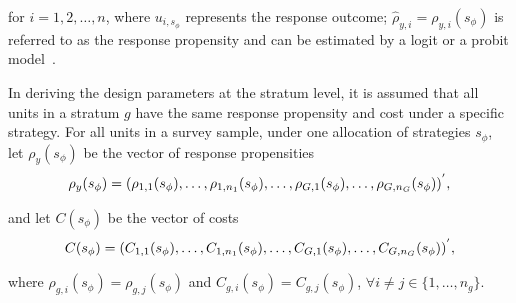 \documentclass[12pt]{article}
\begin{document}
for $i=1,2,\dots,n$, where $u_{i,s_\phi}$ represents the response outcome; $\hat{\rho}_{y,i}=\rho_{y,i}(s_\phi)$ is referred to as the response propensity and can be estimated by a logit or a probit model\unskip~\cite{Bethlehem:2011}.



In deriving the design parameters at the stratum level, it is assumed that all units in a stratum $g$ have the same response propensity and cost under a specific strategy.
For all units in a survey sample, under one allocation of strategies $s_\phi$, let $\rho_y(s_\phi)$ be the vector of response propensities
\let\saveeqnno\theequation
\let\savefrac\frac
\def\dispfrac{\displaystyle\savefrac}
\begin{eqnarray*}
\let\frac\dispfrac
\gdef\theequation{}
\let\theHequation\theequation
	\rho_y(s_\phi)=(\rho_{1,1}(s_\phi),\dots,\rho_{1,n_1}(s_\phi),\dots,\rho_{G,1}(s_\phi),\dots,\rho_{G,n_G}(s_\phi))^{'},
\end{eqnarray*}
\global\let\theequation\saveeqnno
\addtocounter{equation}{-1}\ignorespaces

and let $C(s_\phi)$ be the vector of costs
\let\saveeqnno\theequation
\let\savefrac\frac
\def\dispfrac{\displaystyle\savefrac}
\begin{eqnarray*}
\let\frac\dispfrac
\gdef\theequation{}
\let\theHequation\theequation
	C(s_\phi)=(C_{1,1}(s_\phi),\dots,C_{1,n_1}(s_\phi),\dots,C_{G,1}(s_\phi),\dots,C_{G,n_G}(s_\phi))^{'},
\end{eqnarray*}
\global\let\theequation\saveeqnno
\addtocounter{equation}{-1}\ignorespaces
where $\rho_{g,i}(s_\phi)=\rho_{g,j}(s_\phi)$ and $C_{g,i}(s_\phi)=C_{g,j}(s_\phi)$, $\forall i \neq j \in \{1,\dots,n_g\}$.
\end{document}
